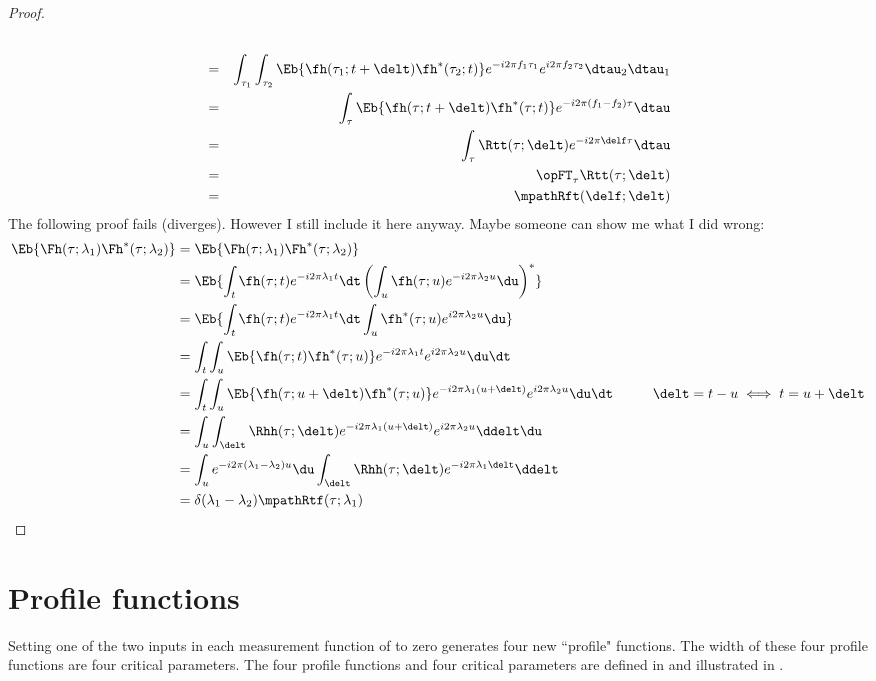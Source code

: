 \begin{proof}
\begin{eqnarray*}
   \\&=& \int_{\tau_1}\int_{\tau_2}\Eb{
             \fh(\tau_1;t+\delt) \fh^\ast(\tau_2;t) }
              e^{-i2\pi f_1\tau_1}e^{i2\pi f_2\tau_2} 
            \dtau_2 \dtau_1
   \\&=& \int_{\tau}\Eb{
             \fh(\tau;t+\delt) \fh^\ast(\tau;t) }
              e^{-i2\pi (f_1-f_2)\tau}
            \dtau
   \\&=& \int_{\tau}\Rtt(\tau;\delt)
              e^{-i2\pi \delf \tau}
            \dtau
   \\&=& \opFT_\tau \Rtt(\tau;\delt)
   \\&=& \mpathRft(\delf;\delt)
\end{eqnarray*}
The following proof fails (diverges).
However I still include it here anyway.
Maybe someone can show me what I did wrong:
\begin{align*}
  \Eb{ \Fh(\tau;\lambda_1) \Fh^\ast(\tau;\lambda_2) }
    &= \Eb{ \Fh(\tau;\lambda_1) \Fh^\ast(\tau;\lambda_2) }
  \\&= \Eb{   \int_t \fh(\tau;t) e^{-i2\pi\lambda_1 t} \dt
       \left( \int_u \fh(\tau;u) e^{-i2\pi\lambda_2 u} \du \right)^\ast
       }
  \\&= \Eb{ \int_t \fh     (\tau;t) e^{-i2\pi\lambda_1 t} \dt
            \int_u \fh^\ast(\tau;u) e^{ i2\pi\lambda_2 u} \du 
       }
  \\&= \int_t \int_u  \Eb{ \fh(\tau;t) \fh^\ast(\tau;u) }
            e^{-i2\pi\lambda_1t} e^{ i2\pi\lambda_2u} \du \dt 
  \\&= \int_t \int_u  \Eb{ \fh(\tau;u+\delt) \fh^\ast(\tau;u) }
            e^{-i2\pi\lambda_1(u+\delt)} e^{ i2\pi\lambda_2u} \du \dt 
       \hspace{1cm}\delt=t-u \iff t=u+\delt
  \\&= \int_u \int_{\delt}  \Rhh(\tau;\delt)
            e^{-i2\pi\lambda_1(u+\delt)} e^{ i2\pi\lambda_2u} \ddelt \du 
  \\&= \int_u e^{-i2\pi(\lambda_1-\lambda_2)u} \du 
       \int_{\delt}  \Rhh(\tau;\delt) e^{-i2\pi\lambda_1\delt}  \ddelt 
  \\&= \delta(\lambda_1-\lambda_2)\mpathRtf(\tau;\lambda_1)
\end{align*}
\end{proof}
\section{Profile functions}
Setting one of the two inputs in each 
measurement function of  to zero
generates four new ``profile" functions.
The width of these four profile functions are four critical parameters.
The four profile functions and four critical parameters are
defined in  and 
illustrated in .


